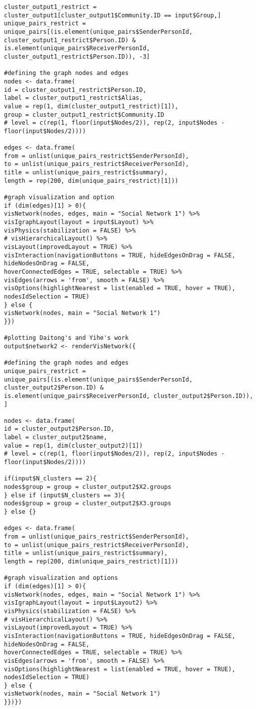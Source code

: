 \begin{verbatim}
cluster_output1_restrict = cluster_output1[cluster_output1$Community.ID == input$Group,]
unique_pairs_restrict = unique_pairs[(is.element(unique_pairs$SenderPersonId, cluster_output1_restrict$Person.ID) & 
is.element(unique_pairs$ReceiverPersonId, cluster_output1_restrict$Person.ID)), -3]

#defining the graph nodes and edges
nodes <- data.frame(
id = cluster_output1_restrict$Person.ID, 
label = cluster_output1_restrict$Alias,
value = rep(1, dim(cluster_output1_restrict)[1]),
group = cluster_output1_restrict$Community.ID
# level = c(rep(1, floor(input$Nodes/2)), rep(2, input$Nodes - floor(input$Nodes/2))))

edges <- data.frame(
from = unlist(unique_pairs_restrict$SenderPersonId),
to = unlist(unique_pairs_restrict$ReceiverPersonId), 
title = unlist(unique_pairs_restrict$summary),
length = rep(200, dim(unique_pairs_restrict)[1]))

#graph visualization and option
if (dim(edges)[1] > 0){
visNetwork(nodes, edges, main = "Social Network 1") %>%
visIgraphLayout(layout = input$Layout) %>%
visPhysics(stabilization = FALSE) %>%
# visHierarchicalLayout() %>%
visLayout(improvedLayout = TRUE) %>%
visInteraction(navigationButtons = TRUE, hideEdgesOnDrag = FALSE, hideNodesOnDrag = FALSE,
hoverConnectedEdges = TRUE, selectable = TRUE) %>%
visEdges(arrows = 'from', smooth = FALSE) %>%
visOptions(highlightNearest = list(enabled = TRUE, hover = TRUE), nodesIdSelection = TRUE)
} else {
visNetwork(nodes, main = "Social Network 1")
}})

#plotting Daitong's and Yihe's work
output$network2 <- renderVisNetwork({

#defining the graph nodes and edges
unique_pairs_restrict = unique_pairs[(is.element(unique_pairs$SenderPersonId, cluster_output2$Person.ID) & 
is.element(unique_pairs$ReceiverPersonId, cluster_output2$Person.ID)), ]

nodes <- data.frame(
id = cluster_output2$Person.ID, 
label = cluster_output2$name,
value = rep(1, dim(cluster_output2)[1])
# level = c(rep(1, floor(input$Nodes/2)), rep(2, input$Nodes - floor(input$Nodes/2))))

if(input$N_clusters == 2){
nodes$group = group = cluster_output2$X2.groups
} else if (input$N_clusters == 3){
nodes$group = group = cluster_output2$X3.groups
} else {}

edges <- data.frame(
from = unlist(unique_pairs_restrict$SenderPersonId),
to = unlist(unique_pairs_restrict$ReceiverPersonId), 
title = unlist(unique_pairs_restrict$summary),
length = rep(200, dim(unique_pairs_restrict)[1]))

#graph visualization and options
if (dim(edges)[1] > 0){
visNetwork(nodes, edges, main = "Social Network 1") %>%
visIgraphLayout(layout = input$Layout2) %>%
visPhysics(stabilization = FALSE) %>%
# visHierarchicalLayout() %>%
visLayout(improvedLayout = TRUE) %>%
visInteraction(navigationButtons = TRUE, hideEdgesOnDrag = FALSE, hideNodesOnDrag = FALSE,
hoverConnectedEdges = TRUE, selectable = TRUE) %>%
visEdges(arrows = 'from', smooth = FALSE) %>%
visOptions(highlightNearest = list(enabled = TRUE, hover = TRUE), nodesIdSelection = TRUE)
} else {
visNetwork(nodes, main = "Social Network 1")
}})})
\end{verbatim}